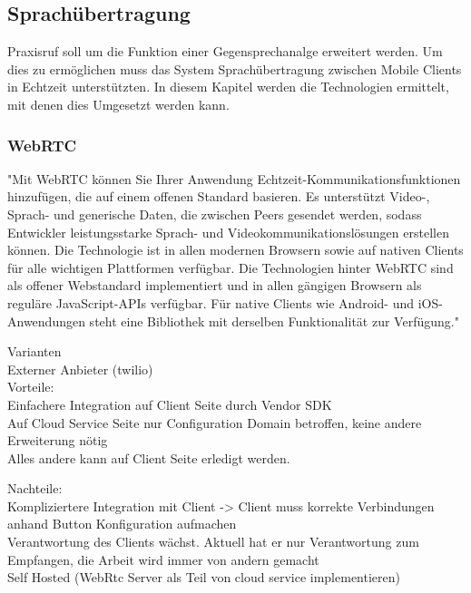 \subsection{Sprachübertragung}

Praxisruf soll um die Funktion einer Gegensprechanalge erweitert werden.
Um dies zu ermöglichen muss das System Sprachübertragung zwischen Mobile Clients in Echtzeit unterstützten.
In diesem Kapitel werden die Technologien ermittelt, mit denen dies Umgesetzt werden kann.

\subsubsection*{WebRTC}

"Mit WebRTC können Sie Ihrer Anwendung Echtzeit-Kommunikationsfunktionen hinzufügen, die auf einem offenen Standard basieren.
Es unterstützt Video-, Sprach- und generische Daten, die zwischen Peers gesendet werden, sodass Entwickler leistungsstarke Sprach- und Videokommunikationslösungen erstellen können.
Die Technologie ist in allen modernen Browsern sowie auf nativen Clients für alle wichtigen Plattformen verfügbar.
Die Technologien hinter WebRTC sind als offener Webstandard implementiert und in allen gängigen Browsern als reguläre JavaScript-APIs verfügbar.
Für native Clients wie Android- und iOS-Anwendungen steht eine Bibliothek mit derselben Funktionalität zur Verfügung."\cite{webrtc}


Varianten \\
Externer Anbieter (twilio) \\

Vorteile: \\

Einfachere Integration auf Client Seite durch Vendor SDK \\
Auf Cloud Service Seite nur Configuration Domain betroffen, keine andere Erweiterung nötig \\
Alles andere kann auf Client Seite erledigt werden.


Nachteile: \\
Kompliziertere Integration mit Client -> Client muss korrekte Verbindungen anhand Button Konfiguration aufmachen \\
Verantwortung des Clients wächst. Aktuell hat er nur Verantwortung zum Empfangen, die Arbeit wird immer von andern gemacht \\


Self Hosted (WebRtc Server als Teil von cloud service implementieren) \\

